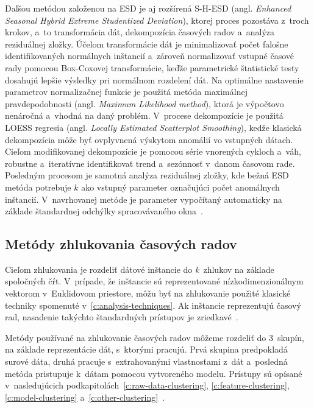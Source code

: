 \documentclass[a4paper,twoside,slovak,12pt,appendix]{article}
\begin{document}
Daľšou metódou založenou na ESD je aj rozšírená S-H-ESD (angl. \textit{Enhanced
Seasonal Hybrid Extreme Studentized Deviation}), ktorej proces pozostáva z~troch
krokov, a~to transformácia dát, dekompozícia časových radov a~analýza
reziduálnej zložky. Účelom transformácie dát je minimalizovať počet falošne
identifikovaných normálnych inštancií a~zároveň normalizovať vstupné časové
rady pomocou Box-Coxovej transformácie, keďže parametrické štatistické testy
dosahujú lepšie výsledky pri normálnom rozdelení dát. Na optimálne nastavenie
parametrov normalizačnej funkcie je použitá metóda maximálnej pravdepodobnosti
(angl. \textit{Maximum Likelihood method}), ktorá je výpočtovo nenáročná
a~vhodná na daný problém. V~procese dekompozície je použitá LOESS regresia
(angl. \textit{Locally Estimated Scatterplot Smoothing}), kedže klasická
dekompozícia môže byť ovplyvnená výskytom anomálií vo vstupných dátach.
Cieľom modifikovanej dekompozície je pomocou série vnorených cykloch a~váh,
robustne a~iteratívne identifikovať trend a~sezónnosť v~danom časovom rade.
Posledným procesom je samotná analýza reziduálnej zložky, kde bežná ESD metóda
potrebuje $k$ ako vstupný parameter označujúci počet anomálnych inštancií.
V~navrhovanej metóde je parameter vypočítaný automaticky na základe štandardnej
odchýlky spracovávaného okna~\cite{Vieira2018}.


\subsection{Metódy zhlukovania časových radov}
Cieľom zhlukovania je rozdeliť dátové inštancie do \textit{k}~zhlukov na základe
spoločných čŕt. V~prípade, že inštancie sú reprezentované nízkodimenzionálnym
vektorom v~Euklidovom priestore, môžu byť na zhlukovanie použité klasické
techniky spomenuté v~\ref{c:analysis-techniques}. Ak inštancie reprezentujú
časový rad, nasadenie takýchto štandardných prístupov je
zriedkavé~\cite{Hautamaki2008}.

Metódy používané na zhlukovanie časových radov môžeme rozdeliť do 3~skupín, na
základe reprezentácie dát, s~ktorými pracujú. Prvá skupina predpokladá surové
dáta, druhá pracuje s~extrahovanými vlastnosťami z~dát a~posledná metóda
pristupuje k~dátam pomocou vytvoreného modelu. Prístupy sú opísané
v~nasledujúcich podkapitolách~\ref{c:raw-data-clustering},
\ref{c:feature-clustering}, \ref{c:model-clustering}
a~\ref{c:other-clustering}~\cite{Rani2012}.
\end{document}
